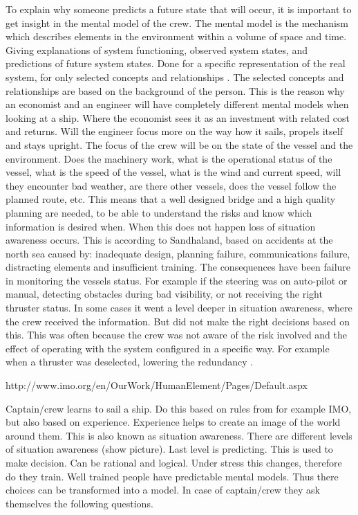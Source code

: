 To explain why someone predicts a future state that will occur, it is important to get insight in the mental model of the crew.
The mental model is the mechanism which describes elements in the environment within a volume of space and time. Giving explanations of system functioning, observed system states, and predictions of future system states. Done for a specific representation of the real system, for only selected concepts and relationships \cite{Kalloniatis2017}. 
The selected concepts and relationships are based on the background of the person. This is the reason why an economist and an engineer will have completely different mental models when looking at a ship. Where the economist sees it as an investment with related cost and returns. Will the engineer focus more on the way how it sails, propels itself and stays upright. 
The focus of the crew will be on the state of the vessel and the environment. Does the machinery work, what is the operational status of the vessel, what is the speed of the vessel, what is the wind and current speed, will they encounter bad weather, are there other vessels, does the vessel follow the planned route, etc. This means that a well designed bridge and a high quality planning are needed, to be able to understand the risks and know which information is desired when. 
When this does not happen loss of situation awareness occurs. This is according to Sandhaland, based on accidents at the north sea caused by: inadequate design, planning failure, communications failure, distracting elements and insufficient training. 
The consequences have been failure in monitoring the vessels status. For example if the steering was on auto-pilot or manual, detecting obstacles during bad visibility, or not receiving the right thruster status. In some cases it went a level deeper in situation awareness, where the crew received the information. But did not make the right decisions based on this. This was often because the crew was not aware of the risk involved and the effect of operating with the system configured in a specific way. For example when a thruster was deselected, lowering the redundancy \cite{Sandhaland2015}.





http://www.imo.org/en/OurWork/HumanElement/Pages/Default.aspx 
 
Captain/crew learns to sail a ship. 
Do this based on rules from for example IMO, but also based on experience. 
Experience helps to create an image of the world around them. 
This is also known as situation awareness. 
There are different levels of situation awareness (show picture). 
Last level is predicting. This is used to make decision. Can be rational and logical. Under stress this changes, therefore do they train.
Well trained people have predictable mental models. Thus there choices can be transformed into a model.
In case of captain/crew they ask themselves the following questions.

